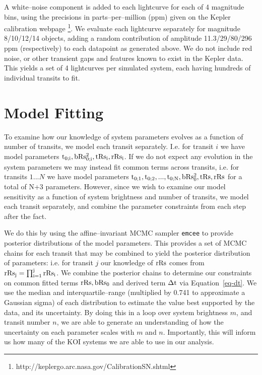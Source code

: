 A white--noise component is added to each lightcurve for each of 4
magnitude bins, using the precisions in parts--per--million (ppm)
given on the Kepler calibration
webpage \footnote{http://keplergo.arc.nasa.gov/CalibrationSN.shtml}.
We evaluate each lightcurve separately for magnitude 8/10/12/14
objects, adding a random contribution of amplitude 11.3/29/80/296 ppm
(respectively) to each datapoint as generated above.  We do not
include red noise, or other transient gaps and features known to exist
in the Kepler data.  This yields a set of 4 lightcurves per simulated
system, each having hundreds of individual transits to fit.

\section{Model Fitting}

To examine how our knowledge of system parameters evolves as a
function of number of transits, we model each transit separately.
I.e. for transit $i$ we have model parameters ${\rm t_{0;i},
  bRs_{0;i}^2, tRs_i, rRs_i}$.  If we do not expect any evolution in
the system parameters we may instead fit common terms across transits,
i.e. for transits $1...N$ we have model parameters ${\rm t_{0;1},
  t_{0;2}, ..., t_{0;N}, bRs_0^2, tRs, rRs}$ for a total of N+3
parameters.  However, since we wish to examine our model sensitivity
as a function of system brightness and number of transits, we model
each transit separately, and combine the parameter constraints from
each step after the fact.

We do this by using the affine--invariant MCMC sampler {\tt emcee}
\citep{2013PASP..125..306F} to provide posterior distributions of the
model parameters.  This provides a set of MCMC chains for each transit
that may be combined to yield the posterior distribution of
parameters: i.e. for transit $j$ our knowledge of ${\rm rRs}$ comes
from ${\rm rRs_j = \prod_{i=1}^j rRs_i}$.  We combine the posterior
chains to determine our constraints on common fitted terms ${\rm rRs,
  bRs_0}$ and derived term ${\rm \Delta t}$ via Equation~\ref{eq-dt}.
We use the median and interquartile--range (multiplied by 0.741 to
approximate a Gaussian sigma) of each distribution to estimate the
value best supported by the data, and its uncertainty.  By doing this
in a loop over system brightness $m$, and transit number $n$, we are
able to generate an understanding of how the uncertainty on each
parameter scales with $m$ and $n$.  Importantly, this will inform us
how many of the KOI systems we are able to use in our analysis.

